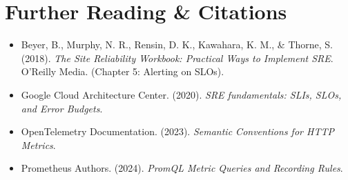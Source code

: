 \section{Further Reading \protect\& Citations}
\begin{itemize}[leftmargin=18pt]
  \item Beyer, B., Murphy, N. R., Rensin, D. K., Kawahara, K. M., \& Thorne, S. (2018). \textit{The Site Reliability Workbook: Practical Ways to Implement SRE}. O'Reilly Media. (Chapter 5: Alerting on SLOs).
  \item Google Cloud Architecture Center. (2020). \textit{SRE fundamentals: SLIs, SLOs, and Error Budgets}.
  \item OpenTelemetry Documentation. (2023). \textit{Semantic Conventions for HTTP Metrics}.
  \item Prometheus Authors. (2024). \textit{PromQL Metric Queries and Recording Rules}.
\end{itemize}
